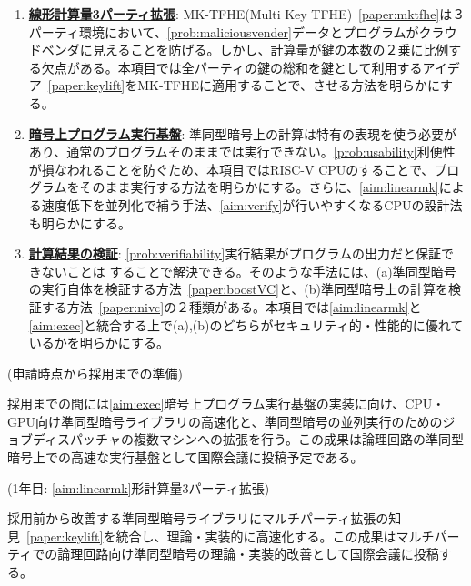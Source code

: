 \begin{enumerate}[label=(\Roman*),leftmargin=1cm]
\setlength{\parskip}{0cm} %
\setlength{\itemsep}{0cm} %
\item \underline{\textbf{線形計算量3パーティ拡張}}: MK-TFHE(Multi Key TFHE)~\ref{paper:mktfhe}は３パーティ環境において、\ref{prob:maliciousvender}データとプログラムがクラウドベンダに見えることを防げる。しかし、計算量が鍵の本数の２乗に比例する欠点がある。本項目では全パーティの鍵の総和を鍵として利用するアイデア~\ref{paper:keylift}をMK-TFHEに適用することで、させる方法を明らかにする。\label{aim:linearmk}

\item \underline{\textbf{暗号上プログラム実行基盤}}: 
準同型暗号上の計算は特有の表現を使う必要があり、通常のプログラムそのままでは実行できない。\ref{prob:usability}利便性が損なわれることを防ぐため、本項目ではRISC-V CPUのすることで、プログラムをそのまま実行する方法を明らかにする。さらに、\ref{aim:linearmk}による速度低下を並列化で補う手法、\ref{aim:verify}が行いやすくなるCPUの設計法も明らかにする。\label{aim:exec}

\item  \underline{\textbf{計算結果の検証}}: \ref{prob:verifiability}実行結果がプログラムの出力だと保証できないことは することで解決できる。そのような手法には、(a)準同型暗号の実行自体を検証する方法~\ref{paper:boostVC}と、(b)準同型暗号上の計算を検証する方法~\ref{paper:nivc}の２種類がある。本項目では\ref{aim:linearmk}と\ref{aim:exec}と統合する上で(a),(b)のどちらがセキュリティ的・性能的に優れているかを明らかにする。\label{aim:verify}
\end{enumerate}


\noindent(申請時点から採用までの準備)

採用までの間には\ref{aim:exec}暗号上プログラム実行基盤の実装に向け、CPU・GPU向け準同型暗号ライブラリの高速化と、準同型暗号の並列実行のためのジョブディスパッチャの複数マシンへの拡張を行う。この成果は論理回路の準同型暗号上での高速な実行基盤として国際会議に投稿予定である。

\noindent(1年目: \ref{aim:linearmk}形計算量3パーティ拡張)

採用前から改善する準同型暗号ライブラリにマルチパーティ拡張の知見~\ref{paper:keylift}を統合し、理論・実装的に高速化する。この成果はマルチパーティでの論理回路向け準同型暗号の理論・実装的改善として国際会議に投稿する。

